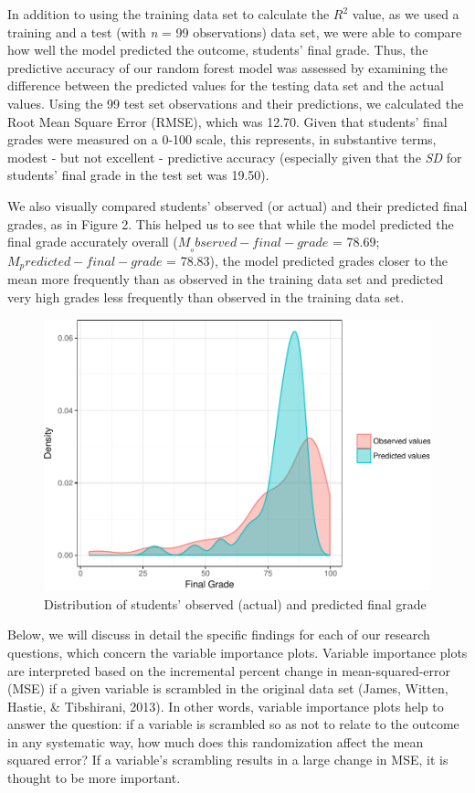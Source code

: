 \documentclass[,acmart]{apa6}
\begin{document}
In addition to using the training data set to calculate the \(R^2\)
value, as we used a training and a test (with \emph{n} = 99
observations) data set, we were able to compare how well the model
predicted the outcome, students' final grade. Thus, the predictive
accuracy of our random forest model was assessed by examining the
difference between the predicted values for the testing data set and the
actual values. Using the 99 test set observations and their predictions,
we calculated the Root Mean Square Error (RMSE), which was 12.70. Given
that students' final grades were measured on a 0-100 scale, this
represents, in substantive terms, modest - but not excellent -
predictive accuracy (especially given that the \emph{SD} for students'
final grade in the test set was 19.50).

We also visually compared students' observed (or actual) and their
predicted final grades, as in Figure 2. This helped us to see that while
the model predicted the final grade accurately overall
(\(M__observed-final-grade\) = 78.69; \(M_predicted-final-grade\) =
78.83), the model predicted grades closer to the mean more frequently
than as observed in the training data set and predicted very high grades
less frequently than observed in the training data set.

\begin{figure}
\centering
\includegraphics{LAK_Manuscript_files/figure-latex/unnamed-chunk-3-1.pdf}
\caption{\label{fig:unnamed-chunk-3}Distribution of students' observed
(actual) and predicted final grade}
\end{figure}

Below, we will discuss in detail the specific findings for each of our
research questions, which concern the variable importance plots.
Variable importance plots are interpreted based on the incremental
percent change in mean-squared-error (MSE) if a given variable is
scrambled in the original data set (James, Witten, Hastie, \&
Tibshirani, 2013). In other words, variable importance plots help to
answer the question: if a variable is scrambled so as not to relate to
the outcome in any systematic way, how much does this randomization
affect the mean squared error? If a variable's scrambling results in a
large change in MSE, it is thought to be more important.
\end{document}

